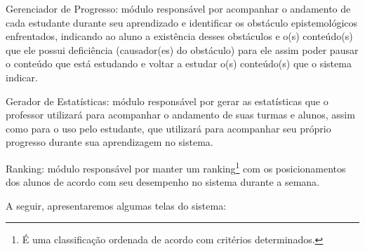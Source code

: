 \begin{alineascomponto}
	\item Gerenciador de Progresso: módulo responsável por acompanhar o andamento de cada estudante durante seu aprendizado e identificar os obstáculo epistemológicos enfrentados, indicando ao aluno 
a exist\^encia desses obst\'aculos e o(s) conte\'udo(s) que ele possui defici\^encia (causador(es) do obstáculo) para ele assim poder pausar o conte\'udo que est\'a estudando e voltar a 
estudar o(s) conte\'udo(s) que o sistema indicar.

	\item Gerador de Estatísticas: módulo responsável por gerar as estatísticas que o professor utilizará para acompanhar o andamento de suas turmas e alunos, assim como para o uso pelo estudante, 
que utilizará para acompanhar seu próprio progresso durante sua aprendizagem no sistema.
    
    \item Ranking: módulo responsável por manter um ranking\footnote{É uma classificação ordenada de acordo com critérios determinados.} com os posicionamentos dos alunos de acordo com seu desempenho 
no sistema durante a semana.
    
\end{alineascomponto}

A seguir, apresentaremos algumas telas do sistema:

